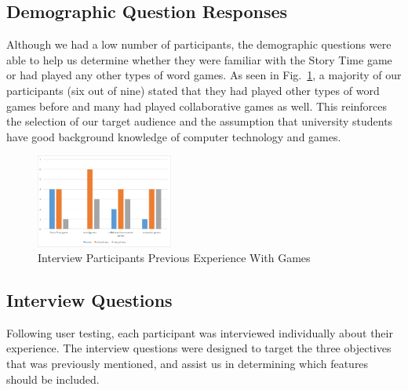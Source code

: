 \documentclass{sigchi}
\begin{document}
\subsection{Demographic Question Responses}
Although we had a low number of participants, the demographic questions were able to help us determine whether they were familiar with the Story Time game or had played any other types of word games. As seen in Fig.\@~\ref{fig:demographics}, a majority of our participants (six out of nine) stated that they had played other types of word games before and many had played collaborative games as well. This reinforces the selection of our target audience and the assumption that university students have good background knowledge of computer technology and games.  

\begin{figure}[H]
\centering
\includegraphics[width=0.4\textwidth]{demographics.png}
\caption{Interview Participants Previous Experience With Games}
\label{fig:demographics}
\end{figure}


\subsection{Interview Questions}
Following user testing, each participant was interviewed individually about their experience. The interview questions were designed to target the three objectives that was previously mentioned, and assist us in determining which features should be included.
\end{document}

